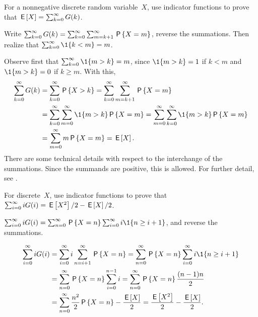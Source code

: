 \documentclass[stochastic-or.tex]{subfiles}
\begin{document}
\begin{exercise}\label{ex:6}
 For a nonnegative discrete random variable~$X$, use indicator functions to prove that $\E X = \sum_{k=0}^\infty G(k)$.
\begin{hint}
Write
$\sum_{k=0}^\infty G(k) = \sum_{k=0}^\infty \sum_{m=k+1}^\infty \P{X=m}$, reverse the summations. Then realize that $\sum_{k=0}^\infty \1{k<m} = m$.
\end{hint}
\begin{solution}
Observe first that $\sum_{k=0}^\infty \1{m>k} = m$, since $\1{m>k}=1$ if $k<m$ and $\1{m>k} = 0$ if $k\geq m$. With this,
\begin{align*}
\sum_{k=0}^\infty G(k)
&= \sum_{k=0}^\infty \P{X>k}
= \sum_{k=0}^\infty \sum_{m=k+1}^\infty \P{X=m} \\
& = \sum_{k=0}^\infty \sum_{m=0}^\infty \1{m>k} \P{X=m}
= \sum_{m=0}^\infty \sum_{k=0}^\infty \1{m>k} \P{X=m} \\
&= \sum_{m=0}^\infty m\P{X=m} = \E X.
\end{align*}
There are some technical details with respect to the interchange of the summations.
Since the summands are positive, this is allowed.
For further detail, see \citet{capinski03:_probab_probl}.
\end{solution}
\end{exercise}

\begin{exercise}\label{ex:66}
For discrete~$X$,  use indicator functions to prove that
$\sum_{i=0}^\infty i G(i) = \E{X^2}/2 - \E{X}/2$.
\begin{hint}
$\sum_{i=0}^\infty i G(i) = \sum_{n=0}^\infty \P{X=n} \sum_{i=0}^\infty i \1{n\geq i+1}$,
and reverse the summations.
\end{hint}
\begin{solution}
\begin{align*}
\sum_{i=0}^\infty i G(i)
&= \sum_{i=0}^\infty i \sum_{n=i+1}^\infty \P{X=n} = \sum_{n=0}^\infty \P{X=n} \sum_{i=0}^\infty i \1{n\geq i+1} \\
&= \sum_{n=0}^\infty \P{X=n} \sum_{i=0}^{n-1}i = \sum_{n=0}^\infty \P{X=n} \frac{(n-1)n}{2} \\
&= \sum_{n=0}^\infty \frac{n^2}{2} \P{X=n} - \frac{\E X}{2}
= \frac{\E{X^2}}{2} - \frac{\E X}{2}.
\end{align*}
\end{solution}
\end{exercise}
\end{document}
